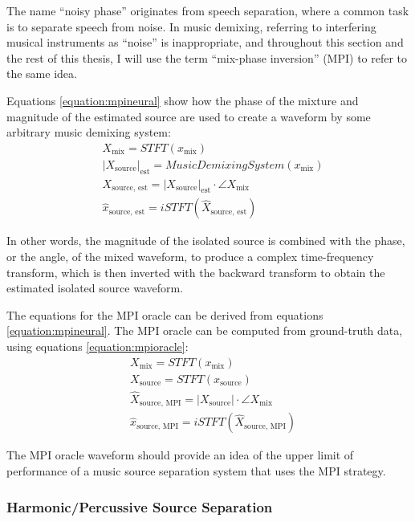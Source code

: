 \documentclass[report.tex]{subfiles}
\begin{document}
The name ``noisy phase'' originates from speech separation, where a common task is to separate speech from noise. In music demixing, referring to interfering musical instruments as ``noise'' is inappropriate, and throughout this section and the rest of this thesis, I will use the term ``mix-phase inversion'' (MPI) to refer to the same idea.

Equations \eqref{equation:mpineural} show how the phase of the mixture and magnitude of the estimated source are used to create a waveform by some arbitrary music demixing system:
\begin{align}\tag{27}\label{equation:mpineural}
	\nonumber & X_{\text{mix}} = \mathit{STFT}(x_{\text{mix}})\\
	\nonumber & {|X_{\text{source}}|}_{\text{est}} = \mathit{MusicDemixingSystem}(x_{\text{mix}})\\
	\nonumber & X_{\text{source, est}} = {|X_{\text{source}}|}_{\text{est}} \cdot \angle{X_{\text{mix}}}\\
	\nonumber & \hat{x}_{\text{source, est}} = \mathit{iSTFT}(\hat{X}_{\text{source, est}})
\end{align}

In other words, the magnitude of the isolated source is combined with the phase, or the angle, of the mixed waveform, to produce a complex time-frequency transform, which is then inverted with the backward transform to obtain the estimated isolated source waveform. 

The equations for the MPI oracle can be derived from equations \eqref{equation:mpineural}. The MPI oracle can be computed from ground-truth data, using equations \eqref{equation:mpioracle}:
\begin{align}\tag{28}\label{equation:mpioracle}
	\nonumber & X_{\text{mix}} = \mathit{STFT}(x_{\text{mix}})\\
	\nonumber & X_{\text{source}} = \mathit{STFT}(x_{\text{source}})\\
	\nonumber & \hat{X}_{\text{source, MPI}} = |X_{\text{source}}| \cdot \angle{X_{\text{mix}}}\\
	\nonumber & \hat{x}_{\text{source, MPI}} = \mathit{iSTFT}(\hat{X}_{\text{source, MPI}})
\end{align}

The MPI oracle waveform should provide an idea of the upper limit of performance of a music source separation system that uses the MPI strategy.

\subsubsection{Harmonic/Percussive Source Separation}
\label{sec:hpss}
\end{document}
